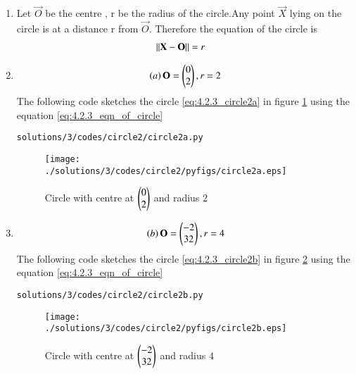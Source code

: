 \begin{enumerate}

\item Let $\vec{O}$ be the centre , r be the radius of the circle.Any point $\vec{X}$ lying on the circle is at a distance r from $\vec{O}$.
\newline
Therefore the equation of the circle is 
\begin{align}
\left\lVert\mathbf{X}-\mathbf{O}\right\rVert &=r
\label{eq:4.2.3_eqn_of_circle}
\end{align}

\item
\begin{align}
\left(a\right)\mathbf{O}=\begin{pmatrix}0\\2\end{pmatrix},r=2
\label{eq:4.2.3_circle2a}
\end{align}
The following code sketches the circle \eqref{eq:4.2.3_circle2a} in figure \ref{fig:4.2.3_circle2a} using the equation \eqref{eq:4.2.3_eqn_of_circle}
\begin{lstlisting}
solutions/3/codes/circle2/circle2a.py
\end{lstlisting}
\begin{figure}[!ht]
\centering
\texttt{[image: ./solutions/3/codes/circle2/pyfigs/circle2a.eps]}
\caption{Circle with centre at $\begin{pmatrix}0\\2\end{pmatrix}$ and radius $2$}
\label{fig:4.2.3_circle2a}
\end{figure}

\item
\begin{align}
\left(b\right)\mathbf{O}=\begin{pmatrix}-2\\32\end{pmatrix},r=4
\label{eq:4.2.3_circle2b}
\end{align}
The following code sketches the circle \eqref{eq:4.2.3_circle2b} in figure \ref{fig:4.2.3_circle2b} using the equation \eqref{eq:4.2.3_eqn_of_circle}
\begin{lstlisting}
solutions/3/codes/circle2/circle2b.py
\end{lstlisting}
\begin{figure}[!ht]
\centering
\texttt{[image: ./solutions/3/codes/circle2/pyfigs/circle2b.eps]}
\caption{Circle with centre at $\begin{pmatrix}-2\\32\end{pmatrix}$ and radius $4$}
\label{fig:4.2.3_circle2b}
\end{figure}



\end{enumerate}
